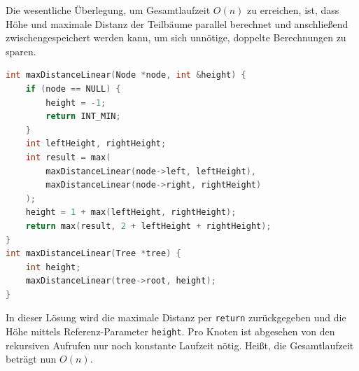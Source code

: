 \documentclass[11pt,a4paper]{article}
\begin{document}
\begin{loesung}
    Die wesentliche Überlegung, um Gesamtlaufzeit $O(n)$ zu erreichen, ist, dass Höhe und maximale Distanz der Teilbäume parallel berechnet und anschließend zwischengespeichert werden kann, um sich unnötige, doppelte Berechnungen zu sparen.
    \begin{lstlisting}[language=c++]
int maxDistanceLinear(Node *node, int &height) {
    if (node == NULL) {
        height = -1;
        return INT_MIN;
    }
    int leftHeight, rightHeight;
    int result = max(
        maxDistanceLinear(node->left, leftHeight),
        maxDistanceLinear(node->right, rightHeight)
    );
    height = 1 + max(leftHeight, rightHeight);
    return max(result, 2 + leftHeight + rightHeight);
}
int maxDistanceLinear(Tree *tree) {
    int height;
    maxDistanceLinear(tree->root, height);
}
    \end{lstlisting}
    In dieser Lösung wird die maximale Distanz per \texttt{return} zurückgegeben und die Höhe mittels Referenz-Parameter \texttt{height}.
    Pro Knoten ist abgesehen von den rekursiven Aufrufen nur noch konstante Laufzeit nötig.
    Heißt, die Gesamtlaufzeit beträgt nun $O(n)$.
\end{loesung}
\end{document}
